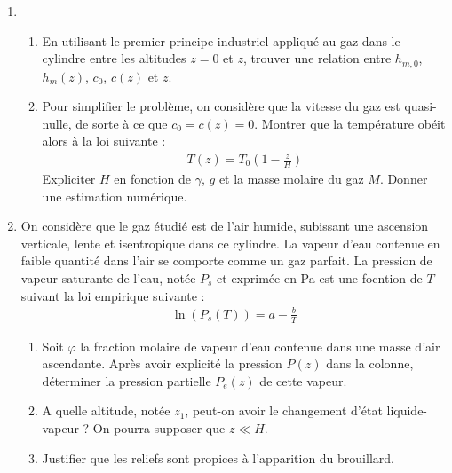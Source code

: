 \begin{enumerate}

\item

\begin{enumerate}
	
	\item En utilisant le premier principe industriel appliqué au gaz dans le cylindre entre les altitudes $z=0$ et $z$, trouver une relation entre $h_{m,0}$, $h_m(z)$, $c_0$, $c(z)$ et $z$.
	
	\item Pour simplifier le problème, on considère que la vitesse du gaz est quasi-nulle, de sorte à ce que $c_0=c(z)=0$. Montrer que la température obéit alors à la loi suivante :
	\begin{align*}
		T(z)=T_0\left( 1-\frac{z}{H}\right) 
	\end{align*}
	Expliciter $H$ en fonction de $\gamma$, $g$ et la masse molaire du gaz $M$. Donner une estimation numérique.
	
\end{enumerate}

\item On considère que le gaz étudié est de l'air humide, subissant une ascension verticale, lente et isentropique dans ce cylindre. La vapeur d'eau contenue en faible quantité dans l'air se comporte comme un gaz parfait. La pression de vapeur saturante de l'eau, notée $P_s$ et exprimée en Pa est une focntion de $T$ suivant la loi empirique suivante :
\begin{align*}
	\ln(P_s(T)) = a -\frac{b}{T}
\end{align*}

\begin{enumerate}
	
	\item Soit $\varphi$ la fraction molaire de vapeur d'eau contenue dans une masse d'air ascendante. Après avoir explicité la pression $P(z)$ dans la colonne, déterminer la pression partielle $P_e(z)$ de cette vapeur. 
	
	\item A quelle altitude, notée $z_1$, peut-on avoir le changement d'état liquide-vapeur ? On pourra supposer que $z\ll H$.
	
	\item Justifier que les reliefs sont propices à l'apparition du brouillard.
	
\end{enumerate}

\end{enumerate}

